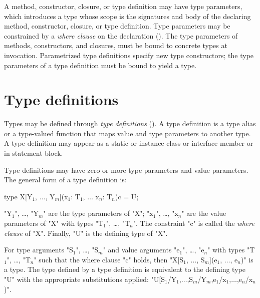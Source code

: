         A method, constructor, closure, or type definition
        may have type parameters, which
        introduces a type whose scope is the signatures and body
        of the declaring method, constructor, closure, or type
        definition.
        Type parameters may be constrained by a {\em where
        clause} on the declaration ().
        The type parameters of methods, constructors, and
        closures, must be bound to
        concrete types at invocation.
        Parametrized type definitions specify new type
        constructors; the type parameters of a type definition must be bound
        to yield a type.

\section{Type definitions}
\label{TypeDefs}


        Types may be defined through {\em type definitions}
        ().
        A type definition is a type alias or a type-valued function
        that maps value and type parameters to another type.
        A type definition may appear as a static or instance
        class or interface
        member or in statement block.

        Type definitions may have zero or more type parameters
        and value parameters.
The general form of a type definition is:

\begin{xtenmath}
type X[Y$_1$, $\dots$, Y$_m$](x$_1$: T$_1$, $\dots$ x$_n$: T$_n$){c} = U;
\end{xtenmath}

\xcdmath"Y$_1$", \dots, \xcdmath"Y$_m$"
are the type parameters of \xcd"X";
\xcdmath"x$_1$", \dots, \xcdmath"x$_n$"
are the value parameters of \xcd"X" with types
\xcdmath"T$_1$", \dots, \xcdmath"T$_n$".
The constraint \xcd"c" is called the \emph{where clause} of
\xcd"X".  Finally, \xcd"U" is the defining type of \xcd"X".

        For
        type arguments 
\xcdmath"S$_1$", \dots, \xcdmath"S$_m$"
and value arguments
\xcdmath"e$_1$", \dots, \xcdmath"e$_n$"
with types
\xcdmath"T$_1$", \dots, \xcdmath"T$_n$"
such that the where clause \xcd"c" holds, then
\xcdmath"X[S$_1$, $\dots$, S$_m$](e$_1$, $\dots$, e$_n$)"
is a type.
The type defined by a type definition is equivalent to 
the defining type \xcd"U" with the appropriate substitutions applied:
\xcdmath"U[S$_1$/Y$_1$,$\dots$,S$_m$/Y$_m$,e$_1$/x$_1$,$\dots$,e$_n$/x$_n$)".

